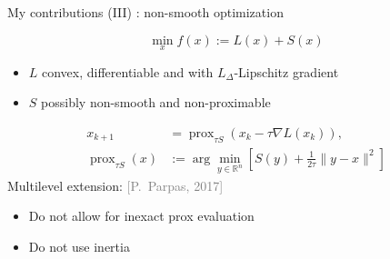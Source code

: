 \documentclass{beamer}
\begin{document}
\begin{frame}{My contributions (III) : non-smooth optimization }

$$
\min_x f(x):=L(x)+S(x)
$$
\begin{footnotesize}
\begin{itemize}
\item $L$ convex, differentiable and with $L_\Delta$-Lipschitz gradient
\item $S$ possibly non-smooth and non-proximable
\end{itemize}
\end{footnotesize}
\begin{tcolorbox}[
      title=Forward-backward iterations,
      colback=white,
      colframe=gray!40,
      boxrule=0.4pt,
      arc=4pt,
      left=6pt, right=6pt, top=0pt, bottom=4pt,
    ]
    \vspace{-0.3cm}
\begin{align*}
x_{k+1}&=\operatorname{prox}_{\tau S}(x_k-\tau \nabla L(x_k)),\\
\operatorname{prox}_{\tau S}(x)&:=\arg\min_{y\in\mathbb{R}^n}\left[S(y)+\frac{1}{2\tau}\|y-x\|^2\right]
\end{align*}
 \vspace{-0.3cm}
Multilevel extension: {\small
\textcolor{gray}{%
[P.~Parpas, 2017]}}
\vspace{0.1cm}


\end{tcolorbox}







	\begin{footnotesize}
\begin{tcolorbox}[
        title={\faExclamationTriangle\ Limitations  },
    colback=red!10,
    colframe=red!70!black,
        fonttitle=\bfseries,
]
\begin{itemize}
\item Do not allow for inexact prox evaluation
\item Do not use inertia
\end{itemize}
\end{tcolorbox}
\end{footnotesize}


\end{frame}
\end{document}

